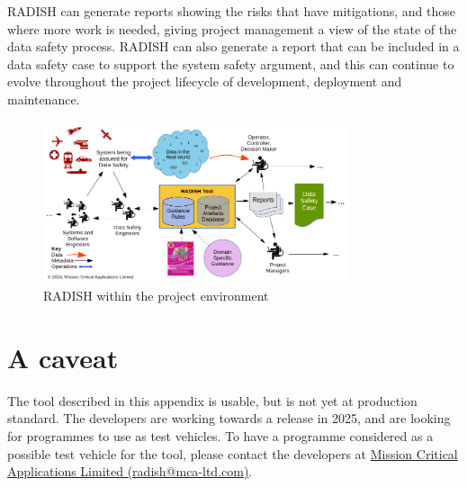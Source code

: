 RADISH can generate reports showing the risks that have mitigations, and those where more work is needed, giving project management a view of the state of the data safety process. RADISH can also generate a report that can be included in a data safety case to support the system safety argument, and this can continue to evolve throughout the project lifecycle of development, deployment and maintenance.

\begin{figure}[htbp]
  \centering
  \includegraphics[angle=90,width=0.8\textwidth]{images/RADISH Tool in Project Environment - landscape.png}
  \caption{RADISH within the project environment}
  \label{fig:radish}
\end{figure}
\section{A caveat}
The tool described in this appendix is usable, but is not yet at production standard.
The developers are working towards a release in 2025, and are looking for programmes to use 
as test vehicles.
To have a programme considered as a possible test vehicle for the tool,
please contact the developers at
\href{mailto:radish@mca-ltd.com}{Mission Critical Applications Limited (radish@mca-ltd.com)}.
